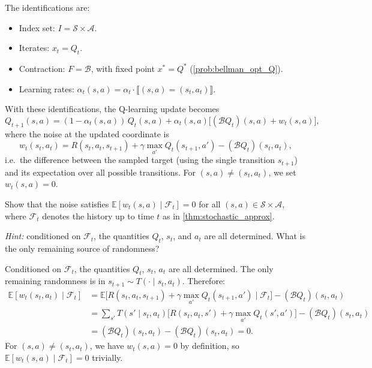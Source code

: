 \documentclass[11pt]{article}
\newcommand{\cS}{\mathcal{S}}
\newcommand{\cA}{\mathcal{A}}
\begin{document}
\begin{solution}
The identifications are:
\begin{itemize}
\item Index set: $I = \cS \times \cA$.
\item Iterates: $x_t = Q_t$.
\item Contraction: $F = \mathcal{B}$, with fixed point $x^* = Q^*$ (\cref{prob:bellman_opt_Q}).
\item Learning rates: $\alpha_t(s,a) = \alpha_t \cdot \llbracket (s,a) = (s_t, a_t) \rrbracket$.
\end{itemize}
With these identifications, the Q-learning update becomes
$$
Q_{t+1}(s,a) = (1 - \alpha_t(s,a))\, Q_t(s,a) + \alpha_t(s,a)\bigl[(\mathcal{B}Q_t)(s,a) + w_t(s,a)\bigr],
$$
where the noise at the updated coordinate is
$$
w_t(s_t, a_t) = R(s_t, a_t, s_{t+1}) + \gamma \max_{a'} Q_t(s_{t+1}, a') - (\mathcal{B}Q_t)(s_t, a_t),
$$
i.e.\ the difference between the sampled target (using the single transition $s_{t+1}$) and its expectation over all possible transitions. For $(s,a) \neq (s_t, a_t)$, we set $w_t(s,a) = 0$.
\end{solution}

\begin{exercise}
\label{prob:noise_zero_mean} Show that the noise satisfies $\mathbb{E}[w_t(s,a) \mid \mathcal{F}_t] = 0$ for all $(s,a) \in \cS \times \cA$, where $\mathcal{F}_t$ denotes the history up to time $t$ as in \cref{thm:stochastic_approx}.

\textit{Hint:} conditioned on $\mathcal{F}_t$, the quantities $Q_t$, $s_t$, and $a_t$ are all determined. What is the only remaining source of randomness?
\end{exercise}

\begin{solution}
Conditioned on $\mathcal{F}_t$, the quantities $Q_t$, $s_t$, $a_t$ are all determined. The only remaining randomness is in $s_{t+1} \sim T(\cdot \mid s_t, a_t)$. Therefore:
\begin{align*}
\mathbb{E}[w_t(s_t, a_t) \mid \mathcal{F}_t]
&= \mathbb{E}\bigl[R(s_t, a_t, s_{t+1}) + \gamma \max_{a'} Q_t(s_{t+1}, a') \mid \mathcal{F}_t\bigr] - (\mathcal{B}Q_t)(s_t, a_t) \\
&= \sum_{s'} T(s' \mid s_t, a_t)\bigl[R(s_t, a_t, s') + \gamma \max_{a'} Q_t(s', a')\bigr] - (\mathcal{B}Q_t)(s_t, a_t) \\
&= (\mathcal{B}Q_t)(s_t, a_t) - (\mathcal{B}Q_t)(s_t, a_t) = 0.
\end{align*}
For $(s,a) \neq (s_t, a_t)$, we have $w_t(s,a) = 0$ by definition, so $\mathbb{E}[w_t(s,a) \mid \mathcal{F}_t] = 0$ trivially.
\end{solution}
\end{document}
